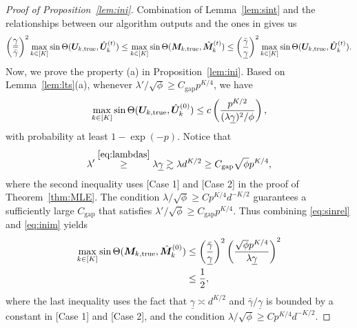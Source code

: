 \documentclass[12pt]{article}
\theoremstyle{definition}
\begin{document}
\begin{proof}[Proof of Proposition~\ref{lem:ini}]
Combination of Lemma~\ref{lem:sint} and the relationships between our algorithm outputs and the ones in \cite{zhang2018tensor} gives us
\begin{align}\label{eq:sinrel}
    \left(\frac{\underline\gamma}{\bar\gamma}\right)^2\max_{k\in[K]}\sin\Theta(\bm{U}_{k,\text{true}},\hat{\bm{U}}_k^{(t)})\leq
    \max_{k\in[K]}\sin\Theta(\bm M_{k,\text{true}},\hat{\bm M}_k^{(t)})\leq \left(\frac{\bar\gamma}{\underline\gamma}\right)^2\max_{k\in[K]}\sin\Theta(\bm{U}_{k,\text{true}},\hat{\bm{U}}_k^{(t)}).
\end{align}
Now, we prove the property (a) in Proposition~\ref{lem:ini}. Based on Lemma~\ref{lem:lts}(a), whenever $\lambda'/\sqrt{\phi}\geq C_{\text{gap}}p^{K/4}$, we have
\begin{align}\label{eq:inim}
    \max_{k\in[K]}\sin \Theta(\bm{U}_{k,\text{true}},\hat{\bm{U}}_k^{(0)}) \leq c\left(\frac{p^{K/2}}{(\lambda\underline\gamma)^2/\phi}\right),
\end{align}
 with probability at least $1-\exp(-p)$.
Notice that
\begin{align}\label{eq:cgap}
    \lambda'\stackrel{\eqref{eq:lambdas}}{\geq} \lambda \underline \gamma\gtrsim \lambda d^{K/2}\geq C_{\text{gap}}\sqrt{\phi} p^{K/4},
\end{align}
where the second inequality uses [Case 1] and [Case 2] in the proof of Theorem~\ref{thm:MLE}. 
The condition $\lambda/\sqrt{\phi}\geq C p^{K/4} d^{-K/2}$ guarantees  a sufficiently large $C_{\text{gap}}$ that satisfies $\lambda'/\sqrt{\phi}\geq C_{\text{gap}}p^{K/4}$.
Thus combining \eqref{eq:sinrel} and \eqref{eq:inim} yields
\begin{align}
    \max_{k\in[K]}\sin\Theta(\bm M_{k,\text{true}},\hat{\bm M}_k^{(0)}) &
    \leq \left(\frac{\bar\gamma}{\underline\gamma}\right)^2\left(\sqrt{\phi}p^{K/4}\over\lambda\underline\gamma\right)^2
    \\
    &\leq \frac{1}{2},
\end{align}
where the last inequality uses the fact that  $\underline\gamma\asymp d^{K/2}$ and $\bar\gamma/\underline\gamma$ is bounded by a constant in [Case 1] and [Case 2], and the condition $\lambda /\sqrt{\phi}\geq Cp^{K/4}d^{-K/2}$.


\end{proof}
\end{document}
